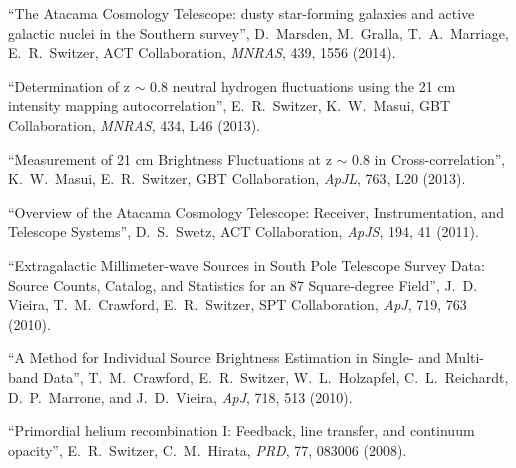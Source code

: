 \item ``The Atacama Cosmology Telescope: dusty star-forming galaxies and active galactic nuclei in the Southern survey'', D.\, Marsden, M.\, Gralla, T.\, A.\, Marriage, E.\, R.\, Switzer, ACT Collaboration, {\it MNRAS}, 439, 1556 (2014).
\item ``Determination of z $\sim$ 0.8 neutral hydrogen fluctuations using the 21 cm intensity mapping autocorrelation'', E.\, R.\, Switzer, K.\, W.\, Masui, GBT Collaboration, {\it MNRAS}, 434, L46 (2013).
\item ``Measurement of 21 cm Brightness Fluctuations at z $\sim$ 0.8 in Cross-correlation'', K.\, W.\, Masui, E.\, R.\, Switzer, GBT Collaboration, {\it ApJL}, 763, L20 (2013).
\item ``Overview of the Atacama Cosmology Telescope: Receiver, Instrumentation, and Telescope Systems'', D.\, S.\, Swetz, ACT Collaboration, {\it ApJS}, 194, 41 (2011).
\item ``Extragalactic Millimeter-wave Sources in South Pole Telescope Survey Data: Source Counts, Catalog, and Statistics for an 87 Square-degree Field'', J.\, D.\, Vieira, T.\, M.\, Crawford, E.\, R.\, Switzer, SPT Collaboration, {\it ApJ}, 719, 763 (2010).
\item ``A Method for Individual Source Brightness Estimation in Single- and Multi-band Data'', T.\, M.\, Crawford, E.\, R.\, Switzer, W.\, L.\, Holzapfel, C.\, L.\, Reichardt, D.\, P.\, Marrone, and J.\, D.\, Vieira, {\it ApJ}, 718, 513 (2010).
\item ``Primordial helium recombination I: Feedback, line transfer, and continuum opacity'', E.\, R.\, Switzer, C.\, M.\, Hirata, {\it PRD}, 77, 083006 (2008).
